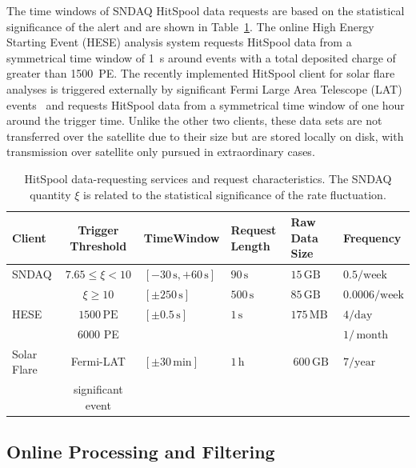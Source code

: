 The time windows of SNDAQ HitSpool data requests are based on the
statistical significance of the alert and are shown in
Table~\ref{tab:hsclients}. The online High Energy Starting Event (HESE) 
analysis system requests HitSpool data from a symmetrical time window of
1~s around events with a total deposited charge of greater than 1500~PE.
The recently implemented HitSpool client for solar flare analyses is
triggered externally by significant Fermi Large Area Telescope (LAT) events~\cite{fermilat:flare}
and requests HitSpool 
data from a symmetrical time window of one hour around the trigger
time. Unlike the other two clients, these data sets are not transferred
over the satellite due to their size but are stored locally on disk, with
transmission over satellite only pursued in extraordinary cases.

\begin{table}
  \caption{HitSpool data-requesting services and request characteristics.
    The SNDAQ quantity $\xi$ is related to the statistical significance of
    the rate fluctuation.}
  \centering
  \footnotesize
\begin{tabularx}{\textwidth}{lcXXXX}
  \toprule Client & Trigger Threshold & Time\newline Window & Request
  Length & Raw \newline Data Size & Frequency \\
  \midrule
  SNDAQ & $7.65 \le \xi < 10$  & $[-30\,\mathrm{s},+60\,\mathrm{s}]$ &
  $90 \,\mathrm{s}$& $15 \,\mathrm{GB}$&
  $0.5/\mathrm{week}$ \\
   & $\xi \ge 10$ &  $[\pm250\,\mathrm{s}]$ & $500\,\mathrm{s}$ & $85
  \,\mathrm{GB}$ & $0.0006 / \mathrm{week}$ \\
  HESE & $1500 \,\mathrm{PE} $ &
  $[\pm0.5\,\mathrm{s}]$& $1\,\mathrm{s}$ & $175\,\mathrm{MB}$ &
  $4/\mathrm{day}$ \\
   & 6000 PE & & & & $1/\,\mathrm{month}$ \\ 
  Solar Flare & Fermi-LAT & $[\pm30\,\mathrm{min}]$ & $1\,\mathrm{h}$&
  $~600\,\mathrm{GB}$& $ 7 / \mathrm{year}$ \\
  & significant event & & & & 
  \\ \bottomrule
\end{tabularx}
\label{tab:hsclients}
\end{table}

\subsection{\label{sect:online:filter}Online Processing and Filtering}

